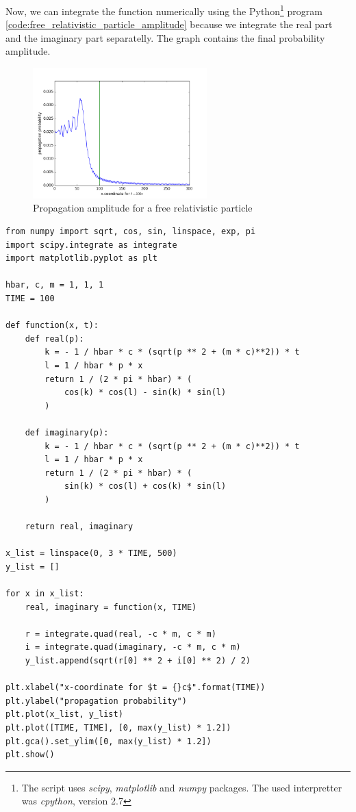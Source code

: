 Now, we can integrate the function numerically using the Python\footnote{The script uses \textit{scipy}, \textit{matplotlib} and \textit{numpy} packages. 
The used interpretter was \textit{cpython}, version 2.7} program \ref{code:free_relativistic_particle_amplitude} because we integrate the 
real part and the imaginary part separatelly. The graph contains the final probability amplitude.

\begin{figure}[h]
    \centering
    \includegraphics[width=0.6\textwidth]{free_relativistic_particle.png}
    \caption{Propagation amplitude for a free relativistic particle}
    \label{fig:free_relativistic_particle_probability}
\end{figure}

\clearpage

\begin{code}
    \label{code:free_relativistic_particle_amplitude}
    \begin{verbatim}
from numpy import sqrt, cos, sin, linspace, exp, pi
import scipy.integrate as integrate
import matplotlib.pyplot as plt

hbar, c, m = 1, 1, 1
TIME = 100

def function(x, t):
    def real(p):
        k = - 1 / hbar * c * (sqrt(p ** 2 + (m * c)**2)) * t
        l = 1 / hbar * p * x
        return 1 / (2 * pi * hbar) * (
            cos(k) * cos(l) - sin(k) * sin(l)
        )

    def imaginary(p):
        k = - 1 / hbar * c * (sqrt(p ** 2 + (m * c)**2)) * t
        l = 1 / hbar * p * x
        return 1 / (2 * pi * hbar) * (
            sin(k) * cos(l) + cos(k) * sin(l)
        )

    return real, imaginary

x_list = linspace(0, 3 * TIME, 500)
y_list = []

for x in x_list:
    real, imaginary = function(x, TIME)

    r = integrate.quad(real, -c * m, c * m)
    i = integrate.quad(imaginary, -c * m, c * m)
    y_list.append(sqrt(r[0] ** 2 + i[0] ** 2) / 2)

plt.xlabel("x-coordinate for $t = {}c$".format(TIME))
plt.ylabel("propagation probability")
plt.plot(x_list, y_list)
plt.plot([TIME, TIME], [0, max(y_list) * 1.2])
plt.gca().set_ylim([0, max(y_list) * 1.2])
plt.show()
    \end{verbatim}
\end{code}

